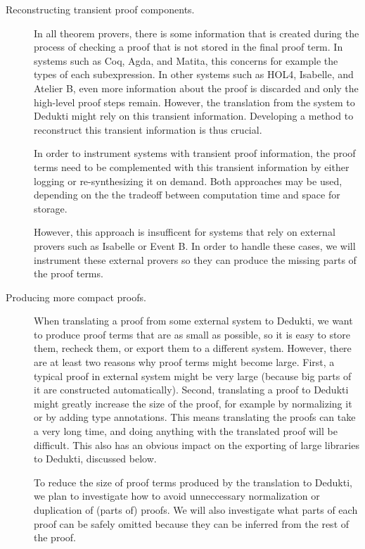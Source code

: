 \begin{description}
  \item[Reconstructing transient proof components.] In all theorem
  provers, there is some information that is created during the
  process of checking a proof that is not stored in the final proof
  term. In systems such as Coq, Agda, and Matita, this concerns for
  example the types of each subexpression. In other systems such as
  HOL4, Isabelle, and Atelier B, even more information about
  the proof is discarded and only the high-level proof steps remain.
  However, the translation from the system to Dedukti might rely on
  this transient information. Developing a method to reconstruct this
  transient information is thus crucial.

  In order to instrument systems with transient proof information, the
  proof terms need to be complemented with this transient information
  by either logging or re-synthesizing it on demand. Both approaches
  may be used, depending on the the tradeoff between computation time
  and space for storage.

  However, this approach is insufficent for systems that rely on
  external provers such as Isabelle or Event B. In order to handle
  these cases, we will instrument these external provers so they can
  produce the missing parts of the proof terms. 

  \item[Producing more compact proofs.] When translating a proof from
    some external system to Dedukti, we want to produce proof terms
    that are as small as possible, so it is easy to store them,
    recheck them, or export them to a different system. However, there
    are at least two reasons why proof terms might become
    large. First, a typical proof in external system might be very
    large (because big parts of it are constructed
    automatically). Second, translating a proof to Dedukti might
    greatly increase the size of the proof, for example by normalizing
    it or by adding type annotations.  This means translating the
    proofs can take a very long time, and doing anything with the
    translated proof will be difficult. This also has an obvious
    impact on the exporting of large libraries to Dedukti, discussed
    below.

  To reduce the size of proof terms produced by the translation to
  Dedukti, we plan to investigate how to avoid unneccessary
  normalization or duplication of (parts of) proofs. We will also
  investigate what parts of each proof can be safely omitted because
  they can be inferred from the rest of the proof.
\end{description}

